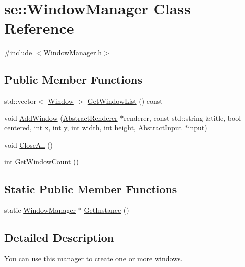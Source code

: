 \hypertarget{classse_1_1_window_manager}{}\section{se\+:\+:Window\+Manager Class Reference}
\label{classse_1_1_window_manager}


{\ttfamily \#include $<$Window\+Manager.\+h$>$}

\subsection*{Public Member Functions}
\begin{DoxyCompactItemize}
\item 
std\+::vector$<$ \mbox{\hyperlink{classse_1_1_window}{Window}} $>$ \mbox{\hyperlink{classse_1_1_window_manager_aa4f9a776e1d8a44f80fea722b7cdb36c}{Get\+Window\+List}} () const
\item 
void \mbox{\hyperlink{classse_1_1_window_manager_a7c5f4786f31a5ffbe12816cc4c1f839a}{Add\+Window}} (\mbox{\hyperlink{classse_1_1_abstract_renderer}{Abstract\+Renderer}} $\ast$renderer, const std\+::string \&title, bool centered, int x, int y, int width, int height, \mbox{\hyperlink{classse_1_1_abstract_input}{Abstract\+Input}} $\ast$input)
\item 
void \mbox{\hyperlink{classse_1_1_window_manager_ae9106e9a62fa38456da31055f3a663ea}{Close\+All}} ()
\item 
int \mbox{\hyperlink{classse_1_1_window_manager_aec9f7b4a351181abd1a9963a33494614}{Get\+Window\+Count}} ()
\end{DoxyCompactItemize}
\subsection*{Static Public Member Functions}
\begin{DoxyCompactItemize}
\item 
static \mbox{\hyperlink{classse_1_1_window_manager}{Window\+Manager}} $\ast$ \mbox{\hyperlink{classse_1_1_window_manager_a95991bd0d710a1e7b05d1faef2581633}{Get\+Instance}} ()
\end{DoxyCompactItemize}


\subsection{Detailed Description}
You can use this manager to create one or more windows. 

